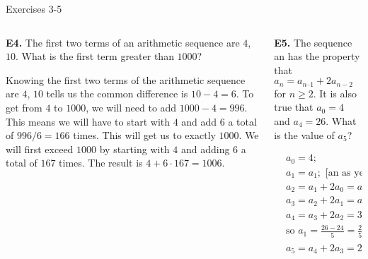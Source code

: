 \documentclass[9pt,aspectratio=169]{beamer}
\begin{document}
\begin{frame}{Exercises 3-5}
  \begin{columns}[T]
    \begin{column}{0.5\textwidth}
      \begin{problem}
        \textbf{E4.} The first two terms of an arithmetic sequence are $4$, $10$. What is the first term greater
        than $1000$?
      \end{problem}
      Knowing the first two terms of the arithmetic sequence are $4$, $10$ tells us the common difference is $10 - 4 = 6$. To get from $4$ to $1000$, we will need to add $1000 - 4 = 996$. This means we will have to start with $4$ and add $6$ a total of $996 / 6 = 166$ times. This will get us to exactly
      $1000$. We will first exceed $1000$ by starting with $4$ and adding $6$ a total of $167$ times. The result is $4 + 6 \cdot 167 = \boxed{1006}$.
    \end{column}
    \begin{column}{0.5\textwidth}
      \begin{problem}
        \textbf{E5.} The sequence an has the property that $a_{n} = a_{n – 1} + 2a_{n-2}$ for $n \geq 2$. It is also
        true that $a_0 = 4$ and $a_4 = 26$. What is the value of $a_{5}$?
      \end{problem}
      \begin{align*}    
        &a_0 = 4;\\
        &a_1 = a_1; \text{ [an as yet unknown value]}\\
        &a_2 = a_1 + 2a_0 = a_1 + 8;\\
        &a_3 = a_2 + 2a_1 = a_1 + 8 + 2a_1 = 3a_1 + 8;\\
        &a_4 = a_3 + 2a_2 = 3a_1 + 8 + 2(a_1 + 8) = 5a_1 + 24 = 26,\\
        &\text{so } a_1 = \frac{26-24}{5} = \frac{2}{5} \text{ and } a_3 = \frac{6}{5} + 8 = \frac{46}{5};\\
        &a_5 = a_4 + 2a_3 = 26 + 2 \times \frac{46}{5} = \frac{130+92}{5} = \boxed{\frac{222}{5}}.
      \end{align*}
    \end{column}
  \end{columns}
\end{frame}
\end{document}
